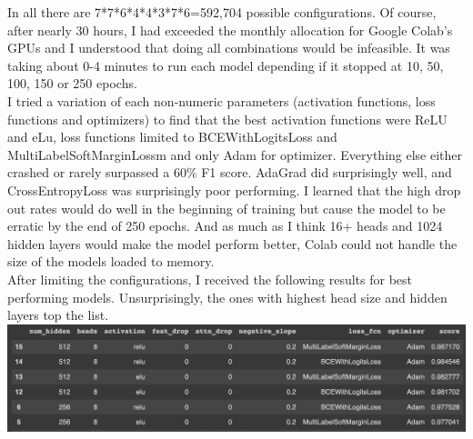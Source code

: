 \documentclass[13pt,english]{article}
\begin{document}
In all there are 7*7*6*4*4*3*7*6=592,704 possible configurations. Of course, after nearly 30 hours, I had exceeded the monthly allocation for Google Colab's GPUs and I understood that doing all combinations would be infeasible. It was taking about 0-4 minutes to run each model depending if it stopped at 10, 50, 100, 150 or 250 epochs. \\
I tried a variation of each non-numeric parameters (activation functions, loss functions and optimizers) to find that the best activation functions were ReLU and eLu, loss functions limited to BCEWithLogitsLoss and MultiLabelSoftMarginLossm and only Adam for optimizer. Everything else either crashed or rarely surpassed a 60\% F1 score. AdaGrad did surprisingly well, and CrossEntropyLoss was surprisingly poor performing. I learned that the high drop out rates would do well in the beginning of training but cause the model to be erratic by the end of 250 epochs. And as much as I think 16+ heads and 1024 hidden layers would make the model perform better, Colab could not handle the size of the models loaded to memory. \\
After limiting the configurations, I received the following results for best performing models. Unsurprisingly, the ones with highest head size and hidden layers top the list. \\
\includegraphics[width=\textwidth]{sorted.png} \\
\end{document}
